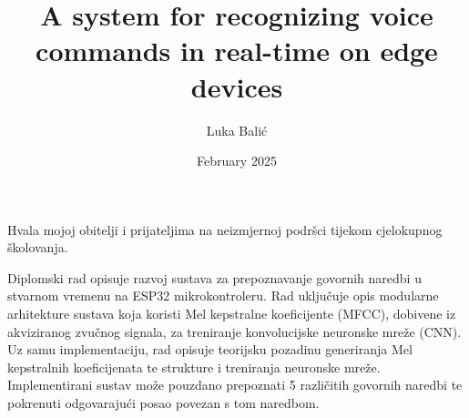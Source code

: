 \documentclass[diplomskirad, upload]{fer}
\title{A system for recognizing voice commands in real-time on edge devices}
\author{Luka Balić}
\date{February 2025}
\begin{document}
\maketitle






\begin{zahvale}
  Hvala mojoj obitelji i prijateljima na neizmjernoj podršci tijekom cjelokupnog školovanja.
\end{zahvale}


\mainmatter


\tableofcontents

%








\begingroup
\small

\endgroup



\begin{sazetak}
  Diplomski rad opisuje razvoj sustava za prepoznavanje govornih naredbi u
  stvarnom vremenu na ESP32 mikrokontroleru. 
  Rad uključuje opis modularne arhitekture sustava koja koristi
  Mel kepstralne koeficijente (MFCC), dobivene iz akviziranog zvučnog signala,
  za treniranje konvolucijske neuronske mreže (CNN). Uz samu implementaciju,
  rad opisuje teorijsku pozadinu generiranja Mel kepstralnih koeficijenata te strukture
  i treniranja neuronske mreže. Implementirani sustav može pouzdano prepoznati 5 različitih
  govornih naredbi te pokrenuti odgovarajući posao povezan s tom naredbom.
\end{sazetak}
\end{document}
